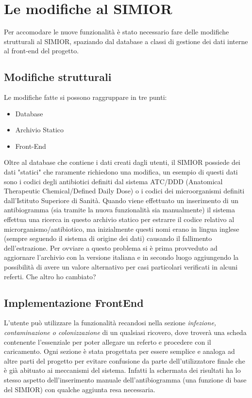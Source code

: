 \chapter{Le modifiche al SIMIOR}
Per accomodare le nuove funzionalità è stato necessario fare delle modifiche strutturali al SIMIOR, spaziando dal database a classi di gestione dei dati interne al front-end del progetto.
\section{Modifiche strutturali}\label{modifiche_strutturali}
Le modifiche fatte si possono raggruppare in tre punti:
\begin{itemize}
	\item Database
	\item Archivio Statico
	\item Front-End
\end{itemize}
Oltre al database che contiene i dati creati dagli utenti, il SIMIOR possiede dei dati "statici" che raramente richiedono una modifica, un esempio di questi dati sono i codici degli antibiotici definiti dal sistema ATC/DDD (Anatomical Therapeutic Chemical/Defined Daily Dose) o i codici dei microorganismi definiti dall'Istituto Superiore di Sanità.
Quando viene effettuato un inserimento di un antibiogramma (sia tramite la nuova funzionalità sia manualmente) il sistema effettua una ricerca in questo archivio statico per estrarre il codice relativo al microrganismo/antibiotico, ma inizialmente questi nomi erano in lingua inglese (sempre seguendo il sistema di origine dei dati) causando il fallimento dell'estrazione. Per ovviare a questo problema si è prima provveduto ad aggiornare l'archivio con la versione italiana e in secondo luogo aggiungendo la possibilità di avere un valore alternativo per casi particolari verificati in alcuni referti.
Che altro ho cambiato?
\newpage
\section{Implementazione FrontEnd}
L'utente può utilizzare la funzionalità recandosi nella sezione \textit{infezione, contaminazione o colonizzazione} di un qualsiasi ricovero, dove troverà una scheda contenente l'essenziale per poter allegare un referto e procedere con il caricamento.
Ogni sezione è stata progettata per essere semplice e analoga ad altre parti del progetto per evitare confusione da parte dell'utilizzatore finale che è già abituato ai meccanismi del sistema. Infatti la schermata dei risultati ha lo stesso aspetto dell'inserimento manuale dell'antibiogramma (una funzione di base del SIMIOR) con qualche aggiunta resa necessaria.
